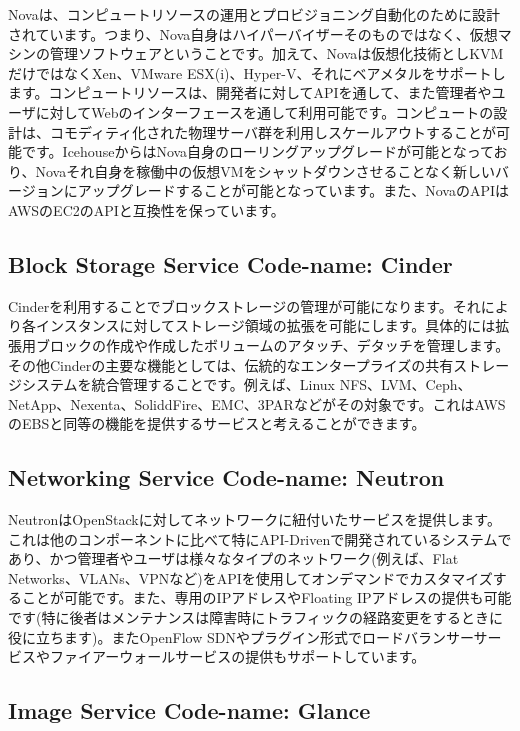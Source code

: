 \documentclass[9pt,b5paper,tombo,openany,dvipdfmx]{jsbook}
\begin{document}
Novaは、コンピュートリソースの運用とプロビジョニング自動化のために設計されています。つまり、Nova自身はハイパーバイザーそのものではなく、仮想マシンの管理ソフトウェアということです。加えて、Novaは仮想化技術としKVMだけではなくXen、VMware ESX(i)、Hyper-V、それにベアメタルをサポートします。コンピュートリソースは、開発者に対してAPIを通して、また管理者やユーザに対してWebのインターフェースを通して利用可能です。コンピュートの設計は、コモディティ化された物理サーバ群を利用しスケールアウトすることが可能です。IcehouseからはNova自身のローリングアップグレードが可能となっており、Novaそれ自身を稼働中の仮想VMをシャットダウンさせることなく新しいバージョンにアップグレードすることが可能となっています。また、NovaのAPIはAWSのEC2のAPIと互換性を保っています。

\subsection{Block Storage Service Code-name: Cinder}

Cinderを利用することでブロックストレージの管理が可能になります。それにより各インスタンスに対してストレージ領域の拡張を可能にします。具体的には拡張用ブロックの作成や作成したボリュームのアタッチ、デタッチを管理します。その他Cinderの主要な機能としては、伝統的なエンタープライズの共有ストレージシステムを統合管理することです。例えば、Linux NFS、LVM、Ceph、NetApp、Nexenta、SoliddFire、EMC、3PARなどがその対象です。これはAWSのEBSと同等の機能を提供するサービスと考えることができます。

\subsection{Networking Service Code-name: Neutron}

NeutronはOpenStackに対してネットワークに紐付いたサービスを提供します。これは他のコンポーネントに比べて特にAPI-Drivenで開発されているシステムであり、かつ管理者やユーザは様々なタイプのネットワーク(例えば、Flat Networks、VLANs、VPNなど)をAPIを使用してオンデマンドでカスタマイズすることが可能です。また、専用のIPアドレスやFloating IPアドレスの提供も可能です(特に後者はメンテナンスは障害時にトラフィックの経路変更をするときに役に立ちます)。またOpenFlow SDNやプラグイン形式でロードバランサーサービスやファイアーウォールサービスの提供もサポートしています。

\subsection{Image Service Code-name: Glance}
\end{document}
